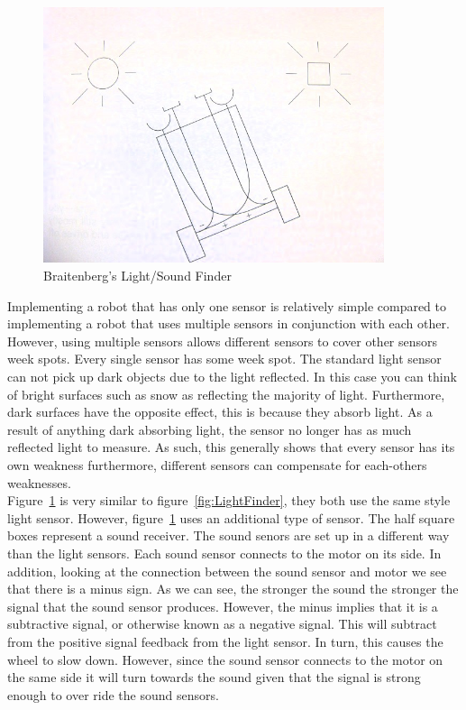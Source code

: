 \vspace*{.2in}
\begin{figure}[htb]
\begin{center}
\leavevmode
\includegraphics[width=100mm]{IMG_0004.JPG}
\end{center}
\caption{Braitenberg's Light/Sound Finder~\cite{RoboticExplorations} }
\label{fig:LightSoundFinder}
\end{figure}

Implementing a robot that has only one sensor is relatively simple compared to implementing a robot that uses multiple sensors in conjunction with each other.  However, using multiple sensors allows different sensors to cover other sensors week spots.  Every single sensor has some week spot.  The standard light sensor can not pick up dark objects due to the light reflected.   In this case you can think of bright surfaces such as snow as reflecting the majority of light.  Furthermore, dark surfaces have the opposite effect, this is because they absorb light.  As a result of anything dark absorbing light, the sensor no longer has as much reflected light to measure.  As such, this generally shows that every sensor has its own weakness furthermore, different sensors can compensate for each-others weaknesses.\\

Figure~\ref{fig:LightSoundFinder} is very similar to figure~\ref{fig:LightFinder}, they both use the same style light sensor.  However, figure~\ref{fig:LightSoundFinder} uses an additional type of sensor.  The half square boxes represent a sound receiver.  The sound senors are set up in a different way than the light sensors.  Each sound sensor connects to the motor on its side.  In addition, looking at the connection between the sound sensor and motor we see that there is a minus sign.  As we can see, the stronger the sound the stronger the signal that the sound sensor produces.  However, the minus implies that it is a subtractive signal, or otherwise known as a negative signal.  This will subtract from the positive signal feedback from the light sensor.  In turn, this causes the wheel to slow down.  However, since the sound sensor connects to the motor on the same side it will turn towards the sound given that the signal is strong enough to over ride the sound sensors.\cite{RoboticExplorations}\\



